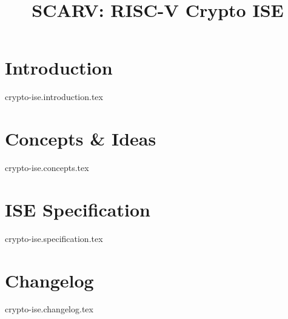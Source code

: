 \documentclass{article}
\title{SCARV: RISC-V Crypto ISE}
\begin{document}
\maketitle
\tableofcontents

\section{Introduction}
{crypto-ise.introduction.tex}

\section{Concepts \& Ideas}
{crypto-ise.concepts.tex}

\section{ISE Specification}
{crypto-ise.specification.tex}


\printbibliography


\section{Changelog}
{crypto-ise.changelog.tex}
\end{document}
